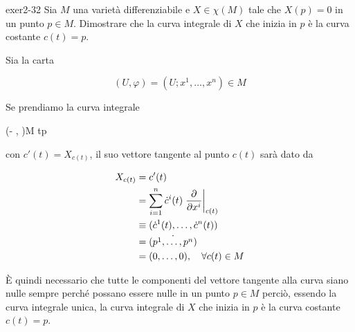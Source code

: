 
{exer2-32}
{
Sia $ M $ una varietà differenziabile e $ X \in \chi(M) $ tale che $ X(p) = 0 $ in un punto $ p \in M $. Dimostrare che la curva integrale di $ X $ che inizia in $ p $ è la curva costante $ c(t) = p $.
}
{
Sia la carta

\begin{equation}
	(U, \varphi) = (U; x^{1},\dots,x^{n}) \in M
\end{equation}

Se prendiamo la curva integrale

	{(- \varepsilon, \varepsilon)}{M}
	{t}{p}

con $ c'(t) = X_{c(t)} $, il suo vettore tangente al punto $ c(t) $ sarà dato da

\begin{align}
	\begin{split}
		X_{c(t)} &= c'(t) \\
		&= \sum_{i=1}^{n} \dot{c}^{i}(t) \eval{ \pdv{x^{i}} }_{c(t)} \\
		&\equiv (\dot{c}^{1}(t), \dots, \dot{c}^{n}(t)) \\
		&= \dot{(p^{1}, \dots, p^{n})} \\
		&= (0,\dots,0) \qcomma \forall c(t) \in M
	\end{split}
\end{align}

È quindi necessario che tutte le componenti del vettore tangente alla curva siano nulle sempre perché possano essere nulle in un punto $ p \in M $ perciò, essendo la curva integrale unica, la curva integrale di $ X $ che inizia in $ p $ è la curva costante $ c(t) = p $.
}


